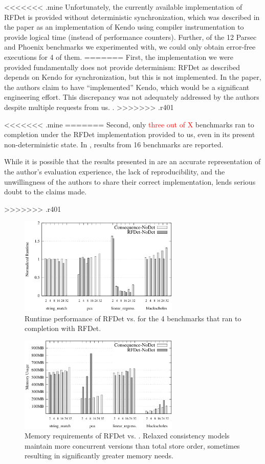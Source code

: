 <<<<<<< .mine
Unfortunately, the currently available implementation of RFDet is provided without deterministic synchronization, which was described in the paper as an implementation of Kendo using compiler instrumentation to provide logical time (instead of performance counters). Further, of the 12 Parsec and Phoenix benchmarks we experimented with, we could only obtain error-free executions for 4 of them.
=======
First, the implementation we were provided fundamentally does not provide determinism: RFDet as described depends on Kendo \cite{olszewski_kendo:_2009} for synchronization, but this is not implemented. In the paper, the authors claim to have ``implemented'' Kendo, which would be a significant engineering effort. This discrepancy was not adequately addressed by the authors despite multiple requests from us. .  
>>>>>>> .r401

<<<<<<< .mine
=======
Second, only \textcolor{red}{three out of X} benchmarks ran to completion under the RFDet implementation provided to us, even in its present non-deterministic state. In \cite{kai_lu_efficient_2014}, results from 16 benchmarks are reported. 

While it is possible that the results presented in \cite{kai_lu_efficient_2014} are an accurate representation of the author's evaluation experience, the lack of reproducibility, and the unwillingness of the authors to share their correct implementation, lends serious doubt to the claims made. 

>>>>>>> .r401
\begin{figure}
\centering
\includegraphics[width=3in]{figures/rfdet_perf}
\caption{Runtime performance of RFDet vs. \lib{} for the 4 benchmarks that ran to completion with RFDet.}
\label{f:rfdet}
\end{figure}


\begin{figure}
\centering
\includegraphics[width=3in]{figures/rfdet_mem}
\caption{Memory requirements of RFDet vs. \lib{}. Relaxed consistency models maintain more concurrent versions than total store order, sometimes resulting in significantly greater memory needs.}
\label{f:rfdet_memory}
\end{figure}

